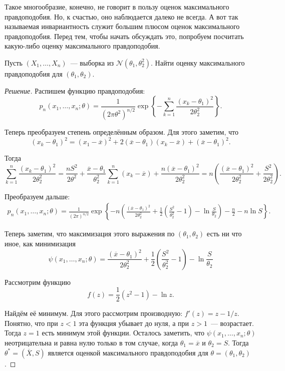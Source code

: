 Такое многообразие, конечно, не говорит в пользу оценок максимального 
правдоподобия. Но, к счастью, оно наблюдается далеко не всегда. А вот так 
называемая инвариантность служит большим плюсом оценок максимального 
правдоподобия. Перед тем, чтобы начать обсуждать это, попробуем посчитать 
какую-либо оценку максимального правдоподобия.
\begin{problem}
	Пусть \((X_{1}, \dots, X_{n})\)~--- выборка из \(\mathcal{N}(\theta_{1}, 
	\theta_{2}^{2})\). Найти оценку максимального правдоподобия для 
	\((\theta_{1}, \theta_{2})\).
\end{problem}
\begin{proof}[Решение]
	Распишем функцию правдоподобия:
	\[
		p_{n}(x_{1}, \dots, x_{n}; \theta) = \frac{1}{(2\pi 
		\theta^{2})^{n/2}}\exp\left\{-\sum_{k = 1}^{n} \frac{(x_{k} - 
		\theta_{1})^{2}}{2\theta_{2}^{2}}\right\}.
	\]
	
	Теперь преобразуем степень определённым образом. Для этого заметим, что 
	\[
		(x_{k} - \theta_{1})^2 = (x_{1} - \overline{x})^2 + 2(\overline{x} - 
		\theta_{1})(x_{k} - \overline{x}) + (\overline{x} - \theta_{1})^2.
	\]
	
	Тогда
	\[
		\sum_{k = 1}^{n} \frac{(x_{k} - \theta_{1})^{2}}{2\theta_{2}^{2}} = 
		\frac{nS^{2}}{2\theta^{2}} + \frac{\overline{x} - 
		\theta_{1}}{\theta_{2}^2}\sum_{k = 1}^{n}(x_{k} - \overline{x}) + 
		\frac{n(\overline{x} - \theta_{1})^{2}}{2\theta_{2}^{2}} = 
		n\left(\frac{(\overline{x} - \theta_{1})^{2}}{2\theta_{2}^{2}} + 
		\frac{S^2}{2\theta_{2}^2}\right).
	\]
	
	Преобразуем дальше:
	\begin{align*}
		p_{n}(x_{1}, \dots, x_{n}; \theta) = 
		\frac{1}{(2\pi)^{n/2}}\exp\left\{-n\left(\frac{(\overline{x} - 
		\theta_{1})^{2}}{2\theta_{2}^{2}} + \frac{1}{2} 
		\left(\frac{S^2}{\theta_{2}^2} - 1\right) - 
		\ln\frac{S}{\theta_{2}}\right) - \frac{n}{2} - n\ln S\right\}.
	\end{align*}

	Теперь заметим, что максимизация этого выражения по \((\theta_{1}, 
	\theta_{2})\) есть ни что иное, как минимизация
	\[
		\psi(x_{1}, \dots, x_{n}; \theta) = \frac{(\overline{x} - 
		\theta_{1})^{2}}{2\theta_{2}^{2}} + \frac{1}{2} 
		\left(\frac{S^2}{\theta_{2}^2} - 1\right) - \ln\frac{S}{\theta_{2}}
	\]
	
	Рассмотрим функцию
	\[
		f(z) = \frac{1}{2}(z^2 - 1) - \ln{z}.
	\]
	
	Найдём её минимум. Для этого рассмотрим производную: \(f'(z) = z - 1/z\). 
	Понятно, что при \(z < 1\) эта функция убывает до нуля, а при \(z > 1\)~--- 
	возрастает. Тогда \(z = 1\) есть минимум этой функции. Осталось заметить, 
	что \(\psi(x_{1}, \dots, x_{n}; \theta)\) неотрицательна и равна нулю 
	только в том случае, когда \(\theta_{1} = \overline{x}\) и \(\theta_{2} = 
	S\). Тогда \(\theta^{*} = (\overline{X}, S)\) является оценкой 
	максимального правдоподобия для \(\theta = (\theta_{1}, \theta_{2})\).
\end{proof}
